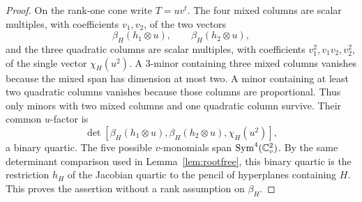 \begin{proof}
On the rank-one cone write \(T=uv^t\).  The four mixed columns are
scalar multiples, with coefficients \(v_1,v_2\), of the two vectors
\[
 \beta_H(h_1\otimes u),\qquad
 \beta_H(h_2\otimes u),
\]
and the three quadratic columns are scalar multiples, with
coefficients \(v_1^2,v_1v_2,v_2^2\), of the single vector
\(\chi_H(u^2)\).  A \(3\)-minor containing three mixed columns
vanishes because the mixed span has dimension at most two.  A minor
containing at least two quadratic columns vanishes because those
columns are proportional.  Thus only minors with two mixed columns
and one quadratic column survive.  Their common \(u\)-factor is
\[
 \det[
   \beta_H(h_1\otimes u),
   \beta_H(h_2\otimes u),
   \chi_H(u^2)
 ],
\]
a binary quartic.  The five possible \(v\)-monomials span
\(\operatorname{Sym}^4(\mathbb C^2_v)\).  By the same determinant comparison used in
Lemma~\ref{lem:rootfree}, this binary quartic is the restriction
\(h_H\) of the Jacobian quartic to the pencil of hyperplanes
containing \(H\).  This proves the assertion without a rank
assumption on \(\beta_H\).
\end{proof}

